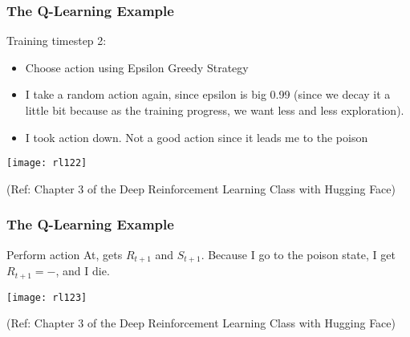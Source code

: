 \begin{frame}[fragile]\frametitle{The Q-Learning Example}

Training timestep 2: 

\begin{itemize}
\item Choose action using Epsilon Greedy Strategy
\item I take a random action again, since epsilon is big 0.99 (since we decay it a little bit because as the training progress, we want less and less exploration).
\item I took action down. Not a good action since it leads me to the poison
\end{itemize}

\begin{center}
\texttt{[image: rl122]}

\end{center}


{\tiny (Ref: Chapter 3 of the Deep Reinforcement Learning Class with Hugging Face)}

\end{frame}

\begin{frame}[fragile]\frametitle{The Q-Learning Example}

 Perform action At, gets $R_{t+1}$ and $S_{t+1}$. Because I go to the poison state, I get $R_{t+1} = -$, and I die.
 
\begin{center}
\texttt{[image: rl123]}

\end{center}


{\tiny (Ref: Chapter 3 of the Deep Reinforcement Learning Class with Hugging Face)}

\end{frame}

